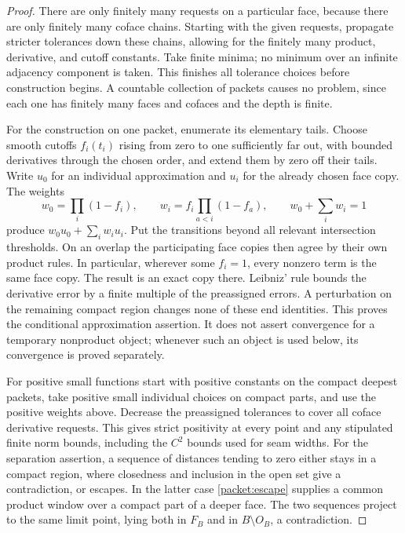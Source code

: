 \begin{proof}
There are only finitely many requests on a particular face, because
there are only finitely many coface chains.  Starting with the given
requests, propagate stricter tolerances down these chains, allowing
for the finitely many product, derivative, and cutoff constants.
Take finite minima; no minimum over an infinite adjacency component
is taken.  This finishes all tolerance choices before construction
begins.  A countable collection of packets causes no problem, since
each one has finitely many faces and cofaces and the depth is finite.

For the construction on one packet, enumerate its elementary tails.
Choose smooth cutoffs $f_i(t_i)$ rising from zero to one sufficiently
far out, with bounded derivatives through the chosen order, and
extend them by zero off their tails.  Write $u_0$ for an individual
approximation and $u_i$ for the already chosen face copy.  The weights
\begin{equation}\label{packet:blend}
 w_0=\prod_i(1-f_i),\qquad
 w_i=f_i\prod_{a<i}(1-f_a),\qquad
 w_0+\sum_iw_i=1
\end{equation}
produce $w_0u_0+\sum_iw_iu_i$.  Put the transitions beyond all relevant
intersection thresholds.  On an overlap the participating face copies
then agree by their own product rules.  In particular, wherever some
$f_i=1$, every nonzero term is the same face copy.  The result is an
exact copy there.  Leibniz' rule bounds the derivative error by a finite
multiple of the preassigned errors.  A perturbation on the remaining
compact region changes none of these end identities.
This proves the conditional approximation assertion.  It does not
assert convergence for a temporary nonproduct object; whenever such
an object is used below, its convergence is proved separately.

For positive small functions start with positive constants on the
compact deepest packets, take positive small individual choices on
compact parts, and use the positive weights above.  Decrease the
preassigned tolerances to cover all coface derivative requests.
This gives strict positivity at every point and any stipulated finite
norm bounds, including the $C^2$ bounds used for seam widths.
For the separation assertion, a sequence of distances tending to
zero either stays in a compact region, where closedness and inclusion
in the open set give a contradiction, or escapes.  In the latter case
\cref{packet:escape} supplies a common product window over a compact
part of a deeper face.  The two sequences project to the same limit
point, lying both in $F_B$ and in $B\setminus O_B$, a contradiction.
\end{proof}

